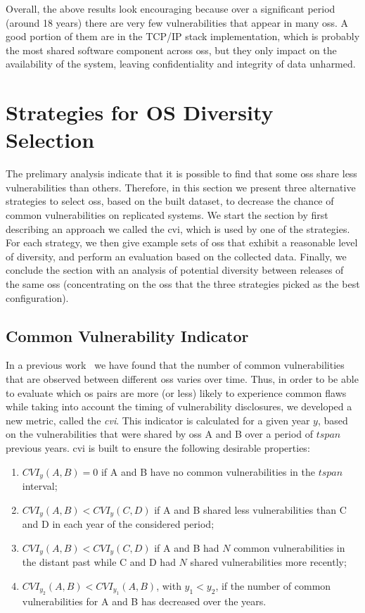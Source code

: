 Overall, the above results look encouraging because over a significant period (around 18 years) there are very few vulnerabilities that appear in many \glspl{os}. 
A good portion of them are in the TCP/IP stack implementation, which is probably the most shared software component across \glspl{os}, but they only impact on the availability of the system, leaving confidentiality and integrity of data unharmed.


\section{Strategies for OS Diversity Selection}\label{evaluation}
The prelimary analysis indicate that it is possible to find that some \glspl{os} share less vulnerabilities than others. 
Therefore, in this section we present three alternative strategies to select \glspl{os}, based on the built dataset, to decrease the chance of common vulnerabilities on replicated systems. 
We start the section by first describing an approach we called the \gls{cvi}, which is used by one of the strategies. 
For each strategy, we then give example sets of \glspl{os} that exhibit a reasonable level of diversity, and perform an evaluation based on the collected data. 
Finally, we conclude the section with an analysis of potential diversity between releases of the same \glspl{os} (concentrating on the \glspl{os} that the three strategies picked as the best configuration).


\subsection{Common Vulnerability Indicator}\label{cvi}
In a previous work~\cite{Garcia:2012} we have found that the number of common vulnerabilities that are observed between different \glspl{os} varies over time. 
Thus, in order to be able to evaluate which \gls{os} pairs are more (or less) likely to experience common flaws while taking into account the timing of vulnerability disclosures, we developed a new metric, called the \emph{\gls{cvi}}. 
This indicator is calculated for a given year $y$, based on the vulnerabilities that were shared by \glspl{os} A and B over a period of $\mathit{tspan}$ previous years. \gls{cvi} is built to ensure the following desirable properties:
\begin{enumerate}
\newcommand{\OLDtheenumi}{\theenumi}
\renewcommand{\theenumi}{\roman{enumi}}
\item $\mathit{CVI}_y(A,B) = 0$ if A and B have no common vulnerabilities in the $\mathit{tspan}$ interval;
\item $\mathit{CVI}_y(A,B) < \mathit{CVI}_y(C,D)$ if A and B shared less vulnerabilities than C and D in each year of the considered period;
\item $\mathit{CVI}_y(A,B) < \mathit{CVI}_y(C,D)$ if A and B had $N$ common vulnerabilities in the distant past while C and D had $N$ shared vulnerabilities more recently;
\item $\mathit{CVI}_{y_2}(A,B) < \mathit{CVI}_{y_1}(A,B)$, with $y_1 < y_2$, if the number of common vulnerabilities for A and B has decreased over the years.
\renewcommand{\theenumi}{\OLDtheenumi}
\end{enumerate}

